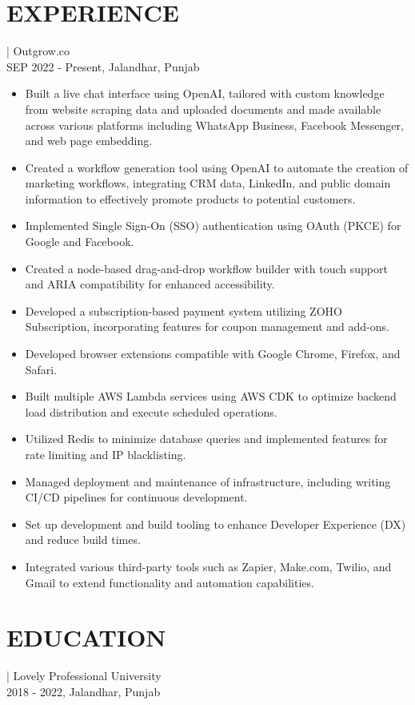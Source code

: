 \documentclass[]{resume}
\begin{document}
\section{EXPERIENCE}
 | \textrm{Outgrow.co}\\
SEP 2022 - Present, Jalandhar, Punjab
\begin{itemize}
  \item Built a live chat interface using OpenAI, tailored with custom knowledge from website scraping data and uploaded documents and made available across various platforms including WhatsApp Business, Facebook Messenger, and web page embedding.
  \item Created a workflow generation tool using OpenAI to automate the creation of marketing workflows, integrating CRM data, LinkedIn, and public domain information to effectively promote products to potential customers.
  \item Implemented Single Sign-On (SSO) authentication using OAuth (PKCE) for Google and Facebook.
  \item Created a node-based drag-and-drop workflow builder with touch support and ARIA compatibility for enhanced accessibility.
  \item Developed a subscription-based payment system utilizing ZOHO Subscription, incorporating features for coupon management and add-ons.
  \item Developed browser extensions compatible with Google Chrome, Firefox, and Safari.
  \item Built multiple AWS Lambda services using AWS CDK to optimize backend load distribution and execute scheduled operations.
  \item Utilized Redis to minimize database queries and implemented features for rate limiting and IP blacklisting.
  \item Managed deployment and maintenance of infrastructure, including writing CI/CD pipelines for continuous development.
  \item Set up development and build tooling to enhance Developer Experience (DX) and reduce build times.
  \item Integrated various third-party tools such as Zapier, Make.com, Twilio, and Gmail to extend functionality and automation capabilities.
\end{itemize}

\section{EDUCATION}
 | \textrm{Lovely Professional University}\\
2018 - 2022, Jalandhar, Punjab
\end{document}
